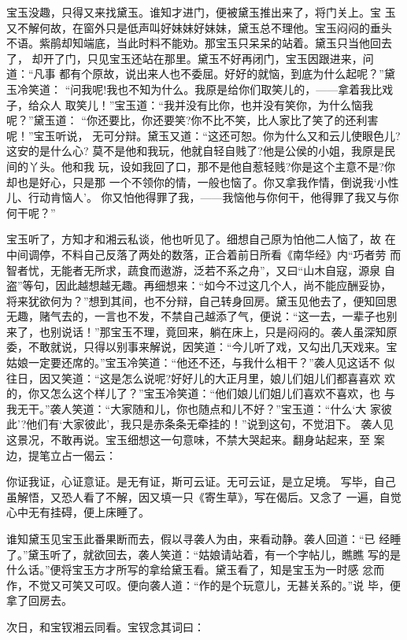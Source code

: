 宝玉没趣，只得又来找黛玉。谁知才进门，便被黛玉推出来了，将门关上。宝
玉又不解何故，在窗外只是低声叫好妹妹好妹妹，黛玉总不理他。宝玉闷闷的垂头
不语。紫鹃却知端底，当此时料不能劝。那宝玉只呆呆的站着。黛玉只当他回去了，
却开了门，只见宝玉还站在那里。黛玉不好再闭门，宝玉因跟进来，问道：“凡事
都有个原故，说出来人也不委屈。好好的就恼，到底为什么起呢？”黛玉冷笑道：
“问我呢!我也不知为什么。我原是给你们取笑儿的，——拿着我比戏子，给众人
取笑儿！”宝玉道：“我并没有比你，也并没有笑你，为什么恼我呢？”黛玉道：
“你还要比，你还要笑?你不比不笑，比人家比了笑了的还利害呢！”宝玉听说，
无可分辩。黛玉又道：“这还可恕。你为什么又和云儿使眼色儿?这安的是什么心?
莫不是他和我玩，他就自轻自贱了?他是公侯的小姐，我原是民间的丫头。他和我
玩，设如我回了口，那不是他自惹轻贱?你是这个主意不是?你却也是好心，只是那
一个不领你的情，一般也恼了。你又拿我作情，倒说我‘小性儿、行动肯恼人’。
你又怕他得罪了我，——我恼他与你何干，他得罪了我又与你何干呢？”

宝玉听了，方知才和湘云私谈，他也听见了。细想自己原为怕他二人恼了，故
在中间调停，不料自己反落了两处的数落，正合着前日所看《南华经》内“巧者劳
而智者忧，无能者无所求，蔬食而遨游，泛若不系之舟”，又曰“山木自寇，源泉
自盗”等句，因此越想越无趣。再细想来：“如今不过这几个人，尚不能应酬妥协，
将来犹欲何为？”想到其间，也不分辩，自己转身回房。黛玉见他去了，便知回思
无趣，赌气去的，一言也不发，不禁自己越添了气，便说：“这一去，一辈子也别
来了，也别说话！”那宝玉不理，竟回来，躺在床上，只是闷闷的。袭人虽深知原
委，不敢就说，只得以别事来解说，因笑道：“今儿听了戏，又勾出几天戏来。宝
姑娘一定要还席的。”宝玉冷笑道：“他还不还，与我什么相干？”袭人见这话不
似往日，因又笑道：“这是怎么说呢?好好儿的大正月里，娘儿们姐儿们都喜喜欢
欢的，你又怎么这个样儿了？”宝玉冷笑道：“他们娘儿们姐儿们喜欢不喜欢，也
与我无干。”袭人笑道：“大家随和儿，你也随点和儿不好？”宝玉道：“什么‘大
家彼此’?他们有‘大家彼此’，我只是赤条条无牵挂的！”说到这句，不觉泪下。
袭人见这景况，不敢再说。宝玉细想这一句意味，不禁大哭起来。翻身站起来，至
案边，提笔立占一偈云：

你证我证，心证意证。是无有证，斯可云证。无可云证，是立足境。
写毕，自己虽解悟，又恐人看了不解，因又填一只《寄生草》，写在偈后。又念了
一遍，自觉心中无有挂碍，便上床睡了。

谁知黛玉见宝玉此番果断而去，假以寻袭人为由，来看动静。袭人回道：“已
经睡了。”黛玉听了，就欲回去，袭人笑道：“姑娘请站着，有一个字帖儿，瞧瞧
写的是什么话。”便将宝玉方才所写的拿给黛玉看。黛玉看了，知是宝玉为一时感
忿而作，不觉又可笑又可叹。便向袭人道：“作的是个玩意儿，无甚关系的。”说
毕，便拿了回房去。

次日，和宝钗湘云同看。宝钗念其词曰：

